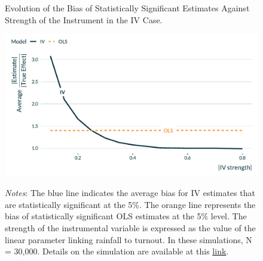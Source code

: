 \documentclass[usletter, 12pt]{article}
\begin{document}
        		
                    		 \begin{figure}[!h] 
                    			\begin{center}
                    				\caption{Evolution of the Bias of Statistically Significant Estimates Against Strength of the Instrument in the IV Case.}
                    				\label{graph_IV}
                    				\includegraphics[width=0.8\linewidth]{images/main_graph_IV_paper_annotated.pdf}
                                    \caption*{\footnotesize \textit{Notes}: The blue line indicates the average bias for IV estimates that are statistically significant at the 5\%. The orange line represents the bias of statistically significant OLS estimates at the 5\% level. The strength of the instrumental variable is expressed as the value of the linear parameter linking rainfall to turnout. In these simulations, N = 30,000. Details on the simulation are available at this \href{https://vincentbagilet.github.io/causal_exaggeration/IV.html}{link}.}
                                    \end{center}
				\vspace{-1cm}
                    		\end{figure} 
		
\end{document}
